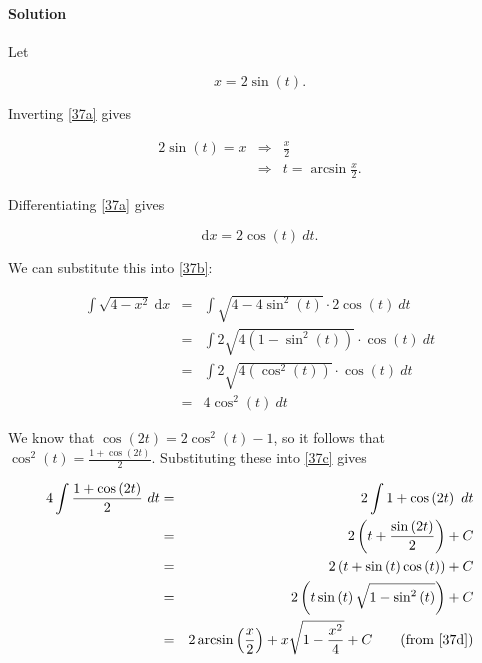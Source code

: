 
\paragraph{Solution} 

Let

\begin{equation}
	x=2\sin\left(t\right)\label{37a}.
\end{equation}

Inverting \ref{37a} gives

\begin{eqnarray}
	2\sin\left(t\right)=x&\Rightarrow&\frac{x}{2}\nonumber\\
	&\Rightarrow&t=\arcsin\frac{x}{2}.\label{37d}
\end{eqnarray}

Differentiating \ref{37a} gives

\[\mbox{d}x=2\cos\left(t\right)~dt.\]

We can substitute this into \ref{37b}:

\begin{eqnarray}
	\int\sqrt{4-x^2}~\mbox{d}x&=&\int\sqrt{4-4\sin^2\left(t\right)}\cdot2\cos\left(t\right)~dt\nonumber\\
	&=&\int2\sqrt{4\left(1-\sin^2\left(t\right)\right)}\cdot\cos\left(t\right)~dt\nonumber\\
	&=&\int2\sqrt{4\left(\cos^2\left(t\right)\right)}\cdot\cos\left(t\right)~dt\nonumber\\
	&=&4\cos^2\left(t\right)~dt\label{37c}
\end{eqnarray}

We know that $\cos\left(2t\right)=2\cos^2\left(t\right)-1$, so it follows that $\cos^2\left(t\right)=\frac{1+\cos\left(2t\right)}{2}$. Substituting these into \ref{37c} gives

\begin{eqnarray*}
	4\int\frac{1+\cos\left(2t\right)}{2}~dt&=&2\int1+\cos\left(2t\right)~dt\\
	&=&2\left(t+\frac{\sin\left(2t\right)}{2}\right)+C\\
	&=&2\left(t+\sin\left(t\right)\cos\left(t\right)\right)+C\\
	&=&2\left(t\sin\left(t\right)\sqrt{1-\sin^2\left(t\right)}\right)+C\\
	&=&2\arcsin\left(\frac{x}{2}\right)+x\sqrt{1-\frac{x^2}{4}}+C\qquad\mbox{(from \ref{37d})}
\end{eqnarray*}
